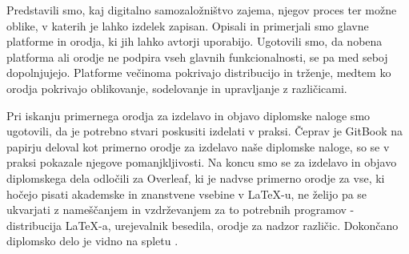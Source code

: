 \documentclass[a4paper, 12pt]{book}
\begin{document}
Predstavili smo, kaj digitalno samozaložništvo zajema, njegov proces ter možne oblike, v katerih je lahko izdelek zapisan. Opisali in primerjali smo glavne platforme in orodja, ki jih lahko avtorji uporabijo. Ugotovili smo, da nobena platforma ali orodje ne podpira vseh glavnih funkcionalnosti, se pa med seboj dopolnjujejo. Platforme večinoma pokrivajo distribucijo in trženje, medtem ko orodja pokrivajo oblikovanje, sodelovanje in upravljanje z različicami.

Pri iskanju primernega orodja za izdelavo in objavo diplomske naloge smo ugotovili, da je potrebno stvari  poskusiti izdelati v praksi. Čeprav je GitBook na papirju deloval kot primerno orodje za izdelavo naše diplomske naloge, so se v praksi pokazale njegove pomanjkljivosti. Na koncu smo se za izdelavo in objavo diplomskega dela odločili za Overleaf, ki je nadvse primerno orodje za vse, ki hočejo pisati akademske in znanstvene vsebine v {\LaTeX-u}, ne želijo pa se ukvarjati z nameščanjem in vzdrževanjem za to potrebnih programov - distribucija {\LaTeX-a}, urejevalnik besedila, orodje za nadzor različic. Dokončano diplomsko delo je vidno na spletu \cite{124}.
\end{document}
